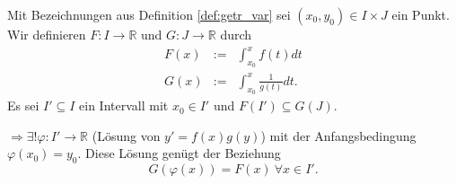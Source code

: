 \documentclass[10pt]{scrbook}
\begin{document}
\begin{Sa}
\label{sa:getr_var}
Mit Bezeichnungen aus Definition \ref{def:getr_var} sei $(x_0, y_0)\in I\times J$ ein Punkt. Wir definieren $F: I\rightarrow \mathbb{R}$ und $G: J\rightarrow \mathbb{R}$ durch
\begin{eqnarray*}
F(x) & := & \int_{x_0}^x f(t) dt \\
G(x) & := & \int_{x_0}^x \frac{1}{g(t)} dt.
\end{eqnarray*}
Es sei $I'\subseteq I$ ein Intervall mit $x_0\in I'$ und $F(I')\subseteq G(J)$.

$\Rightarrow \exists !\varphi: I'\rightarrow \mathbb{R}$ (Lösung von $y'=f(x) g(y)$) mit der Anfangsbedingung $\varphi(x_0)=y_0$. Diese Lösung genügt der Beziehung
\begin{equation}
G(\varphi(x))=F(x)\ \forall x\in I'. \label{eq:getr}
\end{equation}
\end{Sa}
\end{document}
